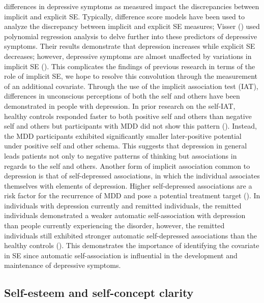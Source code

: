 \documentclass[
  man,
  longtable,
  nolmodern,
  notxfonts,
  notimes,
  colorlinks=true,linkcolor=blue,citecolor=blue,urlcolor=blue]{apa7}
\begin{document}
differences in depressive symptoms as measured impact the discrepancies
between implicit and explicit SE. Typically, difference score models
have been used to analyze the discrepancy between implicit and explicit
SE measures; Visser () used
polynomial regression analysis to delve further into these predictors of
depressive symptoms. Their results demonstrate that depression increases
while explicit SE decreases; however, depressive symptoms are almost
unaffected by variations in implicit SE
(). This complicates the
findings of previous research in terms of the role of implicit SE, we
hope to resolve this convolution through the measurement of an
additional covariate. Through the use of the implicit association test
(IAT), differences in unconscious perceptions of both the self and
others have been demonstrated in people with depression. In prior
research on the self-IAT, healthy controls responded faster to both
positive self and others than negative self and others but participants
with MDD did not show this pattern
(). Instead, the
MDD participants exhibited significantly smaller later-positive
potential under positive self and other schema. This suggests that
depression in general leads patients not only to negative patterns of
thinking but associations in regards to the self and others. Another
form of implicit association common to depression is that of
self-depressed associations, in which the individual associates
themselves with elements of depression. Higher self-depressed
associations are a risk factor for the recurrence of MDD and pose a
potential treatment target (). In individuals with depression currently and remitted
individuals, the remitted individuals demonstrated a weaker automatic
self-association with depression than people currently experiencing the
disorder, however, the remitted individuals still exhibited stronger
automatic self-depressed associations than the healthy controls
(). This demonstrates the importance of identifying the covariate in
SE since automatic self-association is influential in the development
and maintenance of depressive symptoms.

\subsection{Self-esteem and self-concept
clarity}\label{self-esteem-and-self-concept-clarity}
\end{document}
